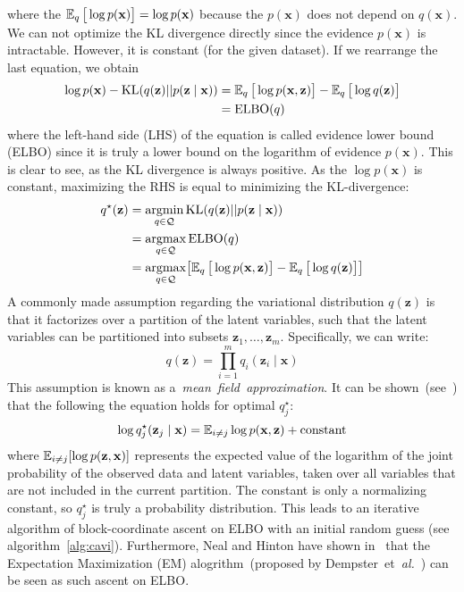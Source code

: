 where the $\operatorname{\mathbb{E}}_q \big[\log p(\mathbf{x})\big] = \log p(\mathbf{x})$ because the $p(\mathbf{x})$ does not depend on $q(\mathbf{x})$. 
We can not optimize the KL divergence directly since the evidence $p(\mathbf{x})$ is intractable. However, it is constant (for the given dataset).
If we rearrange the last equation, we obtain 
\begin{align}
\label{eq:elbo}
\log p(\mathbf{x}) - \mathrm{KL}(q(\mathbf{z}) || p(\mathbf{z} \mid  \mathbf{x})) &= \operatorname{\mathbb{E}}_q \big[\log p(\mathbf{x},\mathbf{z})\big] - \operatorname{\mathbb{E}}_q \big[\log q(\mathbf{z})\big] \\
    &= \mathrm{ELBO}(q) 
\end{align}
where the left-hand side (LHS) of the equation is called evidence lower bound (ELBO) since it is truly a lower bound on the logarithm of evidence 
$p(\mathbf{x})$. This is clear to see, as the KL divergence is always positive. As the $\log p(\mathbf{x})$ is constant, maximizing the RHS is 
equal to minimizing the KL-divergence:
\begin{align*} 
    q^\star(\mathbf{z}) &= \mathop{\rm argmin}_{q \in \mathcal{Q}} \mathrm{KL}(q(\mathbf{z}) || p(\mathbf{z} \mid  \mathbf{x})) \\
                        &= \mathop{\rm argmax}_{q \in \mathcal{Q}} \mathrm{ELBO}(q) \\
                        &= \mathop{\rm argmax}_{q \in \mathcal{Q}} \bigl[ \operatorname{\mathbb{E}}_q \big[\log p(\mathbf{x},\mathbf{z})\big] - \operatorname{\mathbb{E}}_q \big[\log q(\mathbf{z})\big] \bigr]  \\
\end{align*}
A commonly made assumption regarding the variational distribution $q(\mathbf{z})$ is that it factorizes over a partition of the latent variables, 
such that the latent variables can be partitioned into subsets $\mathbf{z}_1,\dots,\mathbf{z}_m$. Specifically, we can write:
$$
q(\mathbf{z}) = \prod_{i=1}^m q_i(\mathbf{z}_i\mid \mathbf{x})
$$
This assumption is known as a~\textit{mean~field~approximation}. It can be shown~(see~\cite{intro-variational-blog-2019}) that the following 
the equation holds for optimal $q^\star_j$: 
$$
\log q^\star_j(\mathbf{z}_j\mid \mathbf{x}) = \operatorname{\mathbb{E}}_{i \neq j} \log p(\mathbf{x},\mathbf{z}) + \text{constant}
$$
where $\operatorname{\mathbb{E}}_{{i\neq j}}[\log p({\mathbf {z}},{\mathbf {x}})]$ represents the expected value of the logarithm of the joint probability 
of the observed data and latent variables, taken over all variables that are not included in the current partition. The constant is 
only a normalizing constant, so $q^\star_j$ is truly a probability distribution. This leads to an iterative 
algorithm of block-coordinate ascent on ELBO with an initial random guess (see algorithm~\ref{alg:cavi}). Furthermore, Neal and Hinton
have shown in~\cite{em-as-vb-1998} that the Expectation Maximization (EM) alogrithm~(proposed by Dempster~et~\textit{al.}~\cite{em-alg-1977}) 
can be seen as such ascent on ELBO. 


